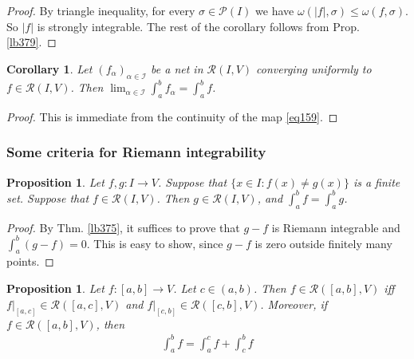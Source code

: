 \documentclass[12pt,b5paper,notitlepage]{article}
\theoremstyle{definition}
\theoremstyle{plain}
\newtheorem{pp}[df]{Proposition}
\newtheorem{co}[df]{Corollary}
\newcommand{\mc}{\mathcal}
\newcommand{\scr}{\mathscr}
\newcommand{\dps}{\displaystyle}
\numberwithin{equation}{section}
\begin{document}
\begin{proof}
By triangle inequality, for every $\sigma\in\mc P(I)$ we have $\omega(|f|,\sigma)\leq \omega(f,\sigma)$. So $|f|$ is strongly integrable. The rest of the corollary follows from Prop. \ref{lb379}.
\end{proof}



\begin{co}\label{lb380}
Let $(f_\alpha)_{\alpha\in\scr I}$ be a net in $\scr R(I,V)$ converging uniformly to $f\in \scr R(I,V)$. Then $\dps\lim_{\alpha\in\scr I}\int_a^b f_\alpha=\int_a^b f$.
\end{co}


\begin{proof}
This is immediate from the continuity of the map \eqref{eq159}.
\end{proof}



\subsubsection{Some criteria for Riemann integrability}



\begin{pp}\label{lb382}
Let $f,g:I\rightarrow V$. Suppose that $\{x\in I:f(x)\neq g(x)\}$ is a finite set. Suppose that $f\in\scr R(I,V)$. Then $g\in\scr R(I,V)$, and $\dps\int_a^bf=\int_a^b g$.
\end{pp}

\begin{proof}
By Thm. \ref{lb375}, it suffices to prove that $g-f$ is Riemann integrable and $\int_a^b(g-f)=0$. This is easy to show, since $g-f$ is zero outside finitely many points. 
\end{proof}





\begin{pp}\label{lb376}
Let $f:[a,b]\rightarrow V$. Let $c\in(a,b)$. Then $f\in\scr R([a,b],V)$ iff $f|_{[a,c]}\in\scr R([a,c],V)$ and $f|_{[c,b]}\in\scr R([c,b],V)$. Moreover, if $f\in\scr R([a,b],V)$, then
\begin{align}
\int_a^b f=\int_a^cf+\int_c^bf\label{eq158}
\end{align}
\end{pp}
\end{document}
